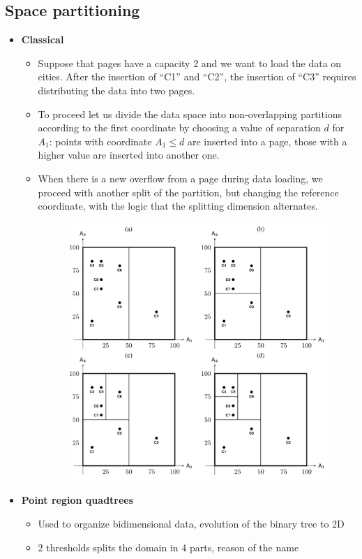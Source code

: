 \subsection{Space partitioning}
\begin{itemize}
    \item \textbf{Classical}
    \begin{itemize}
        \item Suppose that pages have a capacity 2 and we want to load the data on cities. After the insertion of “C1” and “C2”, the insertion of “C3” requires distributing the data into two pages. 
        \item To proceed let us divide the data space into non-overlapping partitions according to the first coordinate by choosing a value of separation $d$ for $A_1$: points with coordinate $A_1 \leq d$ are inserted into a page, those with a higher value are inserted into another one.
        \item When there is a new overflow from a page during data loading, we proceed with another split of the partition, but changing the reference coordinate, with the logic that the splitting dimension alternates.
        
        \begin{figure}[h]
         \centering
         \includegraphics[width=.5\linewidth]{images/DBMS_Internals/MultiDimensionalDataOrganizations/partitioning.jpeg}
        \end{figure}
        
        \end{itemize}

    \newpage
    \item \textbf{Point region quadtrees}
    \begin{itemize}
        \item Used to organize bidimensional data, evolution of the binary tree to 2D
        \item 2 thresholds splits the domain in 4 parts, reason of the name
        

\end{itemize}
\end{itemize}
